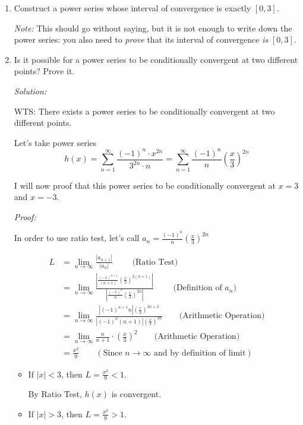 \documentclass[12pt]{exam}
\newcommand {\DS} [1] {${\displaystyle #1}$}
\begin{document}
\begin{enumerate}

\item Construct a power series whose interval of convergence is exactly \DS{[0,3]}. 

\emph{Note:}  This should go without saying, but it is not enough to write down the power series: you also need to \emph{prove} that its interval of convergence \emph{is} \DS{[0,3].}

\item Is it possible for a power series to be conditionally convergent at two different points?  Prove it.

\emph{Solution:}

WTS: There exists a power series to be conditionally convergent at two different points.

Let's take power series $$h(x) = \sum_{n = 1}^{\infty} \frac{(-1)^n\cdot x^{2n}}{3^{2n}\cdot n}= \sum_{n = 1}^{\infty} \frac{(-1)^n}{n}(\frac{x}{3})^{2n}$$

I will now proof that this power series to be conditionally convergent at $x=3$ and $x=-3$.

\emph{Proof:}

In order to use ratio test, let's call $a_n =  \frac{(-1)^n}{n}(\frac{x}{3})^{2n}$

\begin{align*}
	L &= \lim_{n \to \infty} \frac{|a_{n + 1}|}{|a_n|} \qquad\mbox{ (Ratio Test) } \\
	&= \lim_{n \to \infty} \frac{|\frac{(-1)^{n+1}}{(n+1)}(\frac{x}{3})^{2(n+1)}|}{|\frac{(-1)^n}{n}(\frac{x}{3})^{2n}|} \qquad\mbox{ (Definition of } a_n ) \\
	&= \lim_{n \to \infty} \frac{|(-1)^{n+1}n|(\frac{x}{3})^{2n+2}}{|(-1)^n(n+1)|(\frac{x}{3})^{2n}} \qquad\mbox{(Arithmetic Operation)} \\
	&= \lim_{n \to \infty} \frac{n}{n+1}\cdot (\frac{x}{3})^2 \qquad\mbox{(Arithmetic Operation)} \\
	&= \frac{x^2}{9} \qquad( \mbox{Since } n \to \infty \mbox{ and by definition of limit})
\end{align*}

\begin{itemize}
	\item If $|x| < 3$, then $L = \frac{x^2}{9} < 1$.

	By Ratio Test, $h(x)$ is convergent.

	\item If $|x| > 3$, then $L = \frac{x^2}{9} > 1$.


\end{itemize}
\end{enumerate}
\end{document}
